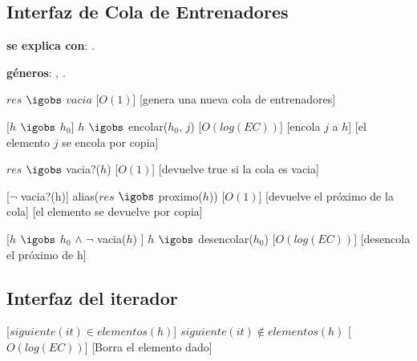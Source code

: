 \begin{Interfaz}
\subsection{Interfaz de Cola de Entrenadores}

  \textbf{se explica con}: .

  \textbf{g\'eneros}: , .



  {$res$ $\igobs$ $vacia$}%
  [$O(1)$]
  [genera una nueva cola de entrenadores]


  [$h$ $\igobs$ $h_0$]
  {$h$ $\igobs$ encolar($h_0$, $j$)}
  [$O(log(EC))$]
  [encola $j$ a $h$]
  [el elemento $j$ se encola por copia]

  {$res$ $\igobs$ vacia?($h$)}
  [$O(1)$]
  [devuelve true si la cola es vacia]


  [$\neg$ vacia?(h)]  
  {alias($res$ $\igobs$ proximo($h$))} 
  [$O(1)$]
  [devuelve el pr\'oximo de la cola]
  [el elemento se devuelve por copia]
  
  
  [$h$ $\igobs$ $h_0$ $\land$ $\neg$ vacia($h$) ]  
  {$h$ $\igobs$ desencolar($h_0$)} 
  [$O(log(EC))$]
  [desencola el pr\'oximo de h]
 


  \subsection{Interfaz del iterador}
 
  [$siguiente(it) \in elementos(h)$]
  {$siguiente(it) \not\in elementos(h)$}
  [$O(log(EC))$]
  [Borra el elemento dado]
  
\end{Interfaz}


